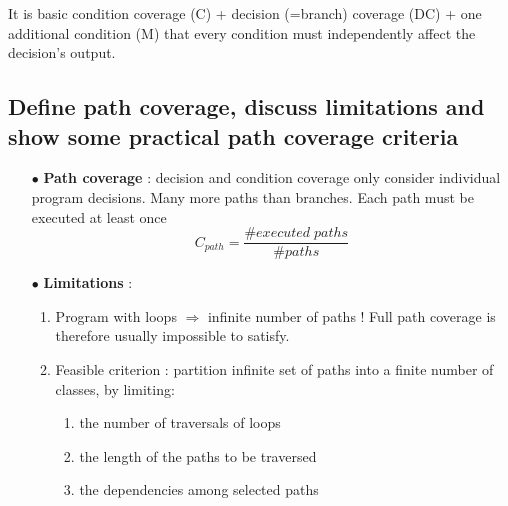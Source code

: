 \documentclass{article}
\begin{document}
\begin{multicols}{2}
\begin{enumerate}
It is basic condition coverage (C) + decision (=branch) coverage (DC) + one additional condition (M) that every condition must independently affect the decision’s output.
\end{enumerate}
\end{multicols}

\subsection{Define
path coverage, discuss limitations and show some practical path coverage
criteria}
\begin{multicols}{2}
\begin{itemize}
    \item[$\bullet$] \textbf{Path coverage} : decision and condition coverage only consider individual program decisions. Many more paths than branches. Each path must be executed at least once
    $$C_{path} = \frac{\#executed\;paths}{\#paths}$$
    \item[$\bullet$] \textbf{Limitations} :
     \begin{enumerate}
         \item Program with loops $\Rightarrow$ infinite number of paths ! Full path coverage is therefore usually
impossible to satisfy.
        \item Feasible criterion : partition infinite set of paths into a finite number of classes, by limiting:
        \begin{enumerate}
            \item the number of traversals of loops
            \item the length of the paths to be traversed
            \item the dependencies among selected paths
        \end{enumerate}
       

\end{enumerate}
\end{itemize}
\end{multicols}
\end{document}
